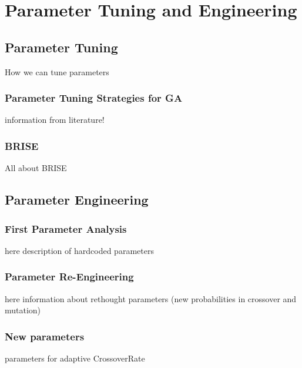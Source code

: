 \chapter{Parameter Tuning and Engineering}\label{tuning}

\section{Parameter Tuning}
How we can tune parameters
\subsection{Parameter Tuning Strategies for GA}
	information from literature!
\subsection{BRISE}
	All about BRISE
\section{Parameter Engineering}

\subsection{First Parameter Analysis}
	here description of {\LARGE hardcoded} parameters
\subsection{Parameter Re-Engineering}
	here information about rethought parameters (new probabilities in crossover and mutation) 
\subsection{New parameters}
	parameters for adaptive CrossoverRate
